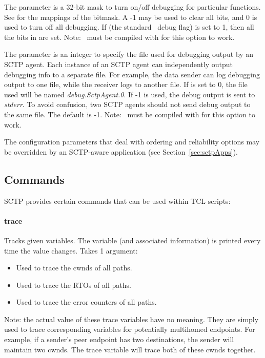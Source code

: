 	 The  parameter is a 32-bit mask to turn on/off
	 debugging for particular functions. See
	  for the mappings of the bitmask. A -1
	 may be used to clear all bits, and 0 is used to turn off all
	 debugging. If  (the standard \ns~debug flag) is set to
	 1, then all the bits in  are set. Note: \ns~must
	 be compiled with  for this option to work.

	 The  parameter is an integer to specify the
	 file used for debugging output by an SCTP agent. Each instance of
	 an SCTP agent can independently output debugging info to a
	 separate file. For example, the data sender can log debugging
	 output to one file, while the receiver logs to another file. If
	  is set to 0, the file used will be named
	 {\em debug.SctpAgent.0}. If -1 is used, the debug output is sent
	 to {\em stderr}. To avoid confusion, two SCTP agents should not
	 send debug output to the same file. The default is -1.  Note:
	 \ns~must be compiled with  for this option to work.

	 The configuration parameters that deal with ordering and
	 reliability options may be overridden by an SCTP-aware
	 application (see Section~\ref{sec:sctpApps}).


      \subsection{Commands}
      \label{sec:sctpCommands}

	 SCTP provides certain commands that can be used within TCL
	 scripts:

	 \paragraph{trace} Tracks given variables. The variable (and associated
	 information) is printed every time the value changes. Takes 1
	 argument:
	    \begin{itemize}

	       \item[]  Used to trace the cwnds of all
	       paths. 

	       \item[]  Used to trace the RTOs of all paths.

	       \item[]  Used to trace the error counters
	       of all paths.

	    \end{itemize}
	 Note: the actual value of these trace variables have no
	 meaning. They are simply used to trace corresponding variables
	 for potentially multihomed endpoints. For example, if a sender's
	 peer endpoint has two destinations, the sender will maintain two
	 cwnds. The  trace variable will trace both of these
	 cwnds together.

